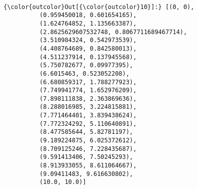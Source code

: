 \documentclass[11pt]{article}
\begin{document}
    \begin{center}
    \end{center}
    { \hspace*{\fill} \\}
    
\begin{Verbatim}[commandchars=\\\{\}]
{\color{outcolor}Out[{\color{outcolor}10}]:} [(0, 0),
          (0.959450018, 0.601654165),
          (1.624764852, 1.135663387),
          (2.8625629607532748, 0.8067711689467714),
          (3.510984324, 0.542973539),
          (4.408764689, 0.842580013),
          (4.511237914, 0.137945568),
          (5.750782677, 0.09977395),
          (6.6015463, 0.523052208),
          (6.680859317, 1.788277923),
          (7.749941774, 1.652976209),
          (7.898111838, 2.363869636),
          (8.288016985, 3.224815881),
          (7.771464401, 3.839438624),
          (7.772324292, 5.110640891),
          (8.477585644, 5.82781197),
          (9.189224875, 6.025372612),
          (8.709125246, 7.228435687),
          (9.591413406, 7.50245293),
          (8.913933055, 8.611064667),
          (9.09411483, 9.616630802),
          (10.0, 10.0)]
\end{Verbatim}
            
\end{document}
